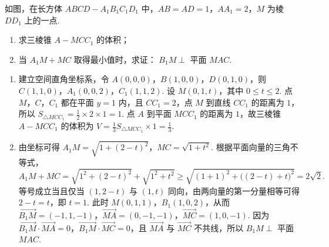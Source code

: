 \begin{problem}
如图，在长方体 \(ABCD - A_{1}B_{1}C_{1}D_{1}\) 中，\(AB = AD = 1\)，\(AA_{1} = 2\)，\(M\) 为棱 \(DD_{1}\) 上的一点.
\begin{enumerate}
\item 求三棱锥 \( A - MCC_{1} \) 的体积；
\item 当 \(A_{1}M + MC\) 取得最小值时，求证： \(B_{1}M \perp\) 平面 \(MAC\).
\end{enumerate}

\end{problem}

\begin{solution}
\begin{enumerate}
\item 建立空间直角坐标系，令 \(A(0,0,0)\)，\(B(1,0,0)\)，\(D(0,1,0)\)，则 \(C(1,1,0)\)，\(A_1(0,0,2)\)，\(C_1(1,1,2)\). 设 \(M(0,1,t)\)，其中 \(0\leqslant t\leqslant2\). 点 \(M\)，\(C\)，\(C_1\) 都在平面 \(y=1\) 内，且 \(CC_1=2\)，点 \(M\) 到直线 \(CC_1\) 的距离为 \(1\)，所以 \(S_{\triangle MCC_1}=\frac12\times2\times1=1\). 点 \(A\) 到平面 \(MCC_1\) 的距离为 \(1\)，故三棱锥 \(A-MCC_1\) 的体积为 \(V=\frac13S_{\triangle MCC_1}\times1=\frac13\).
\item 由坐标可得 \(A_1M=\sqrt{1+(2-t)^2}\)，\(MC=\sqrt{1+t^2}\). 根据平面向量的三角不等式，\[
A_1M+MC=\sqrt{1^2+(2-t)^2}+\sqrt{1^2+t^2}\geqslant\sqrt{(1+1)^2+\bigl((2-t)+t\bigr)^2}=2\sqrt{2}.
\]
等号成立当且仅当 \((1,2-t)\) 与 \((1,t)\) 同向，由两向量的第一分量相等可得 \(2-t=t\)，即 \(t=1\). 此时 \(M(0,1,1)\)，\(B_1(1,0,2)\)，从而 \(\overrightarrow{B_1M}=(-1,1,-1)\)，\(\overrightarrow{MA}=(0,-1,-1)\)，\(\overrightarrow{MC}=(1,0,-1)\). 因为 \(\overrightarrow{B_1M}\cdot\overrightarrow{MA}=0\)，\(\overrightarrow{B_1M}\cdot\overrightarrow{MC}=0\)，且 \(\overrightarrow{MA}\) 与 \(\overrightarrow{MC}\) 不共线，所以 \(B_1M\perp\) 平面 \(MAC\).
\end{enumerate}
\end{solution}

